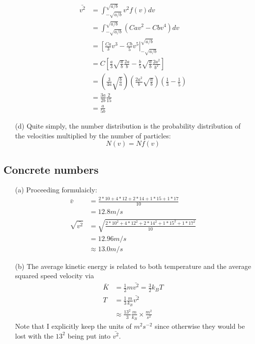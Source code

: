 \documentclass{article}
\begin{document}
\begin{itemize}
	\begin{align*}
	\bar{v^2} &= \int_{-\sqrt{a/b}}^{\sqrt{a/b}}v^2f(v)dv \\
	&= \int_{-\sqrt{a/b}}^{\sqrt{a/b}}(Cav^2-Cbv^4)dv \\
	&= \left[ \frac{Ca}{3}v^3 - \frac{Cb}{5}v^5\right|_{-\sqrt{a/b}}^{\sqrt{a/b}} \\
	&= C\left[\frac{a}{3}\sqrt{\frac{a}{b}}\frac{2a}{b}-\frac{b}{5}\sqrt{\frac{a}{b}}\frac{2a^2}{b^2}\right] \\
	&= \left(\frac{3}{4a}\sqrt{\frac{b}{a}}\right)\left(\frac{2a^2}{b}\sqrt{\frac{a}{b}}\right)\left(\frac{1}{3}-\frac{1}{5}\right) \\
	&= \frac{3a}{2b}\frac{2}{15} \\
	&= \frac{a}{5b}
	\end{align*}
	\item[(d)] Quite simply, the number distribution is the probability distribution of the velocities multiplied by the number of particles:
	\begin{equation}
	N(v) = Nf(v)
	\end{equation}
\end{itemize}

\subsection{Concrete numbers}

\begin{itemize}
	\item[(a)] Proceeding formulaicly:
	\begin{align*}
	\bar{v} &= \frac{2*10 + 4*12 + 2*14 + 1*15 + 1*17}{10} \\
	&= 12.8 m/s \\
	\sqrt{\bar{v^2}} &= \sqrt{\frac{2*10^2 + 4*12^2 + 2*14^2 + 1*15^2 + 1*17^2}{10}} \\
	&= 12.96 m/s \\
	&\approx 13.0 m/s
	\end{align*}
	\item[(b)] The average kinetic energy is related to both temperature and the average squared speed velocity via
	\begin{align*}
	\bar{K} &= \frac{1}{2}m\bar{v^2} = \frac{3}{2}k_B T \\
	T &= \frac{1}{3}\frac{m}{k_B}\bar{v^2} \\
	&\approx \frac{13^2}{3}\frac{m}{k_B}\times\frac{m^2}{s^2}
	\end{align*}
	Note that I explicitly keep the units of $m^2 s^{-2}$ since otherwise they would be lost with the $13^2$ being put into $\bar{v^2}$.
\end{itemize}
\end{document}
